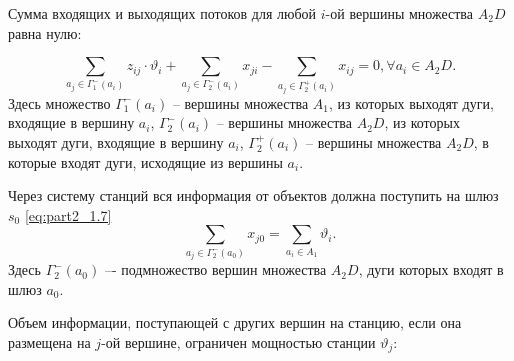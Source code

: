
Сумма входящих и выходящих потоков для любой $i$-ой вершины множества $A_2D$ равна нулю:

\begin{equation}\label{eq:part2_1.6}
    \sum_{a_j \in \Gamma_1^-(a_i)} z_{ij} \cdot \vartheta_i + \sum_{a_j \in \Gamma_2^-(a_i)} x_{ji} -  \sum_{a_j \in \Gamma_2^+(a_i)} x_{ij} =0 ,\forall a_i \in A_2D. 
\end{equation}
Здесь множество $\Gamma_1^-(a_i)$ – вершины множества $A_1$, из которых выходят дуги, входящие в вершину $a_i$, $\Gamma_2^-(a_i)$ – вершины множества $A_2D$, из которых выходят дуги, входящие в  вершину $a_i$, $\Gamma_2^+(a_i)$ – вершины множества $A_2D$, в которые входят дуги, исходящие из вершины $a_i$.

Через систему станций вся информация от объектов  должна поступить на шлюз $s_0$ \cref{eq:part2_1.7}
\begin{equation}\label{eq:part2_1.7}
    \sum_{a_j \in \Gamma_2^-(a_0)} x_{j0} = \sum_{a_i \in A_1} \vartheta_i.
\end{equation}
Здесь $\Gamma_2^-(a_0)$ –- подмножество вершин множества $A_2D$, дуги которых входят в шлюз $a_0$.





Объем информации, поступающей с других вершин на станцию, если она размещена на $j$-ой вершине, ограничен мощностью станции $\vartheta_j$:


